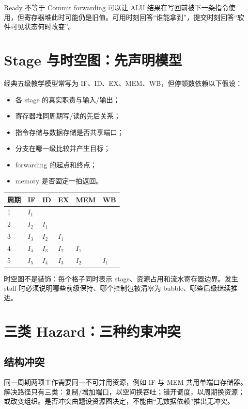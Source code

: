 \documentclass[UTF8,fontset=fandol,11pt,a4paper]{ctexart}
\begin{document}
\begin{warnbox}{Ready 不等于 Commit}
forwarding 可以让 ALU 结果在写回前被下一条指令使用，但寄存器堆此时可能仍是旧值。可用时刻回答“谁能拿到”，提交时刻回答“软件可见状态何时改变”。
\end{warnbox}

\section{Stage 与时空图：先声明模型}

经典五级教学模型常写为 IF、ID、EX、MEM、WB，但停顿数依赖以下假设：
\begin{itemize}
  \item 各 stage 的真实职责与输入/输出；
  \item 寄存器堆同周期写/读的先后关系；
  \item 指令存储与数据存储是否共享端口；
  \item 分支在哪一级比较并产生目标；
  \item forwarding 的起点和终点；
  \item memory 是否固定一拍返回。
\end{itemize}

\begin{center}
\small
\begin{tabularx}{\linewidth}{C{1.5cm}YYYYY}
\toprule
周期 & IF & ID & EX & MEM & WB\\
 & $I_1$ & & & &\\
2 & $I_2$ & $I_1$ & & &\\
3 & $I_3$ & $I_2$ & $I_1$ & &\\
4 & $I_4$ & $I_3$ & $I_2$ & $I_1$ &\\
5 & $I_5$ & $I_4$ & $I_3$ & $I_2$ & $I_1$\\
\bottomrule
\end{tabularx}
\end{center}

时空图不是装饰：每个格子同时表示 stage、资源占用和流水寄存器边界。发生 stall 时必须说明哪些前级保持、哪个控制包被清零为 bubble、哪些后级继续推进。

\section{三类 Hazard：三种约束冲突}

\subsection{结构冲突}
同一周期两项工作需要同一不可并用资源，例如 IF 与 MEM 共用单端口存储器。解决路径只有三类：复制/增加端口，以空间换吞吐；错开调度，以周期换资源；或改变组织。是否冲突由题设资源图决定，不能由“无数据依赖”推出无冲突。
\end{document}
